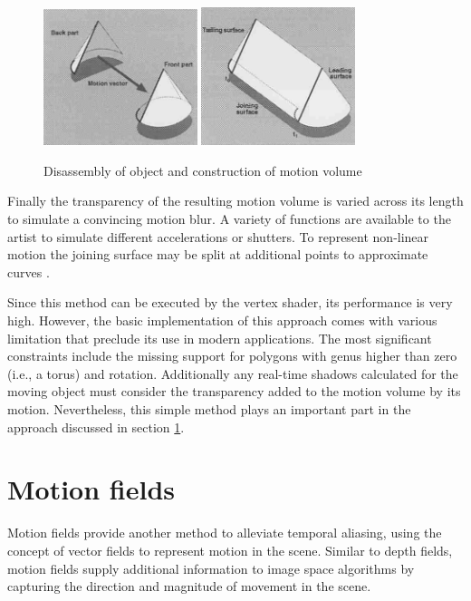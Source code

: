 \begin{figure}
    \centering
    \includegraphics[width=0.4\textwidth]{images/object-splitting.png}
    \includegraphics[width=0.4\textwidth]{images/object-splitting-assembly.png}
    \caption{Disassembly of object and construction of motion volume \cite{Wloka.1996}}
    \label{fig:object-splitting}
\end{figure}

Finally the transparency of the resulting motion volume is varied across its length to simulate a convincing motion blur.
A variety of functions are available to the artist to simulate different accelerations or shutters.
To represent non-linear motion the joining surface may be split at additional points to approximate curves \cite{Wloka.1996}.

Since this method can be executed by the vertex shader, its performance is very high.
However, the basic implementation of this approach comes with various limitation that preclude its use in modern applications.
The most significant constraints include the missing support for polygons with genus higher than zero (i.e., a torus) and rotation.
Additionally any real-time shadows calculated for the moving object must consider the transparency added to the motion volume by its motion.
Nevertheless, this simple method plays an important part in the approach discussed in section \ref{ch:mb-mf}.

\section{Motion fields}
\label{ch:mb-mf}
Motion fields provide another method to alleviate temporal aliasing, using the concept of vector fields to represent motion in the scene.
Similar to depth fields, motion fields supply additional information to image space algorithms by capturing the direction and magnitude of movement in the scene.

